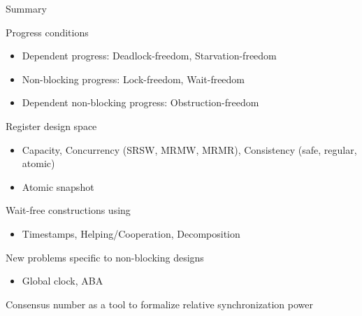 \begin{frame}{Summary}

Progress conditions
\begin{itemize}
  \item Dependent progress: Deadlock-freedom, Starvation-freedom
  \item Non-blocking progress: Lock-freedom, Wait-freedom
  \item Dependent non-blocking progress: Obstruction-freedom
\end{itemize}

Register design space
\begin{itemize}
  \item Capacity, Concurrency (SRSW, MRMW, MRMR), Consistency (safe, regular, atomic)
  \item Atomic snapshot
\end{itemize}

Wait-free constructions using
\begin{itemize}
  \item Timestamps, Helping/Cooperation, Decomposition 
\end{itemize}

New problems specific to non-blocking designs
\begin{itemize}
  \item Global clock, ABA
\end{itemize}

Consensus number as a tool to formalize relative synchronization power

% 
% 
% 
% 
% 
% 
% 
% 

\end{frame}

